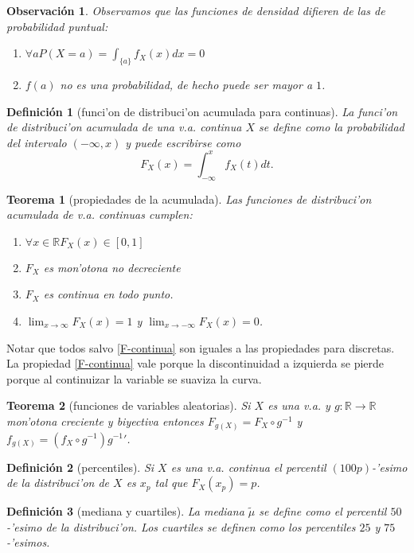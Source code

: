 \documentclass[a4paper,spanish]{article}
\newcommand{\R}[0]{\mathbb{R}}
\newcommand{\limite}[2]{\lim_{ #1 \rightarrow #2}}
\newcommand{\comp}[0]{\circ}
\newtheorem{teo}{Teorema}
\newtheorem{defi}{Definici\'on}
\newtheorem{obs}{Observaci\'on}
\begin{document}
\begin{obs}
Observamos que las funciones de densidad difieren de las de probabilidad 
puntual:
\begin{enumerate}
\item $\forall a P(X = a) = \int_{\{a\}} f_X(x) dx = 0$
\item $f(a)$ no es una probabilidad, de hecho puede ser mayor a $1$.
\end{enumerate}
\end{obs}

\begin{defi}[funci'on de distribuci'on acumulada para continuas]
La \emph{funci'on de distribuci'on acumulada} de una v.a. continua $X$ se
define como la probabilidad del intervalo $(-\infty, x)$ y puede escribirse
como 
$$F_X(x) = \int_{-\infty}^x f_X(t) dt.$$
\end{defi}

\begin{teo}[propiedades de la acumulada]
Las funciones de distribuci'on acumulada de v.a. continuas cumplen:
\begin{enumerate}
\item $\forall x \in \R F_X(x) \in [0,1]$
\item $F_X$ es mon'otona no decreciente
\item \label{F-continua}$F_X$ es continua en todo punto.
\item $\limite{x}{\infty} F_X(x) = 1$ y $\limite{x}{-\infty} F_X(x) = 0$.
\end{enumerate}
\end{teo}
Notar que todos salvo \ref{F-continua} son iguales a las propiedades para 
discretas. La propiedad \ref{F-continua} vale porque la discontinuidad a 
izquierda se pierde porque al continuizar la variable se suaviza la curva.

\begin{teo}[funciones de variables aleatorias]
Si $X$ es una v.a. y $g : \R \to \R$ mon'otona creciente y biyectiva entonces 
$F_{g(X)} = F_X \comp g^{-1}$ y $f_{g(X)} = (f_X \comp g^{-1}) {g^{-1}}'$.
\end{teo}

\begin{defi}[percentiles]
Si $X$ es una v.a. continua el percentil $(100 p)$-'esimo de la distribuci'on
de $X$ es $x_p$ tal que $F_X(x_p) = p$.
\end{defi}

\begin{defi}[mediana y cuartiles]
La mediana $\tilde{\mu}$ se define como el percentil $50$-'esimo de la
distribuci'on. Los cuartiles se definen como los percentiles $25$ y 
$75$-'esimos.
\end{defi}
\end{document}
